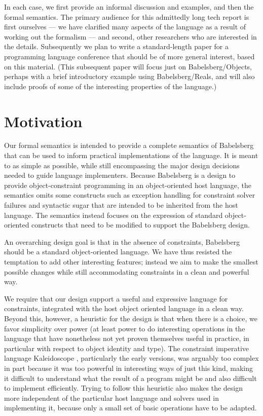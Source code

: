 \documentclass{article}
\begin{document}
In each case, we first provide an informal discussion and examples,
and then the formal semantics.  The primary audience for this
admittedly long tech report is first ourselves --- we have clarified
many aspects of the language as a result of working out the formalism
--- and second, other researchers who are interested in the details.
Subsequently we plan to write a standard-length paper for a
programming language conference that should be of more general
interest, based on this material.  (This subsequent paper will focus just
on Babelsberg/Objects, perhaps with a brief introductory example using
Babelsberg/Reals, and will also include proofs of some of the
interesting properties of the language.)

\section{Motivation}

Our formal semantics is intended to provide a complete semantics of
Babelsberg that can be used to inform practical implementations of
the language. It is meant to as simple as possible, while still 
encompassing the
major design decisions needed to guide language implementers. Because
Babelsberg is a design to provide object-constraint programming in an
object-oriented host language, the semantics omits some constructs
such as exception handling for constraint solver failures and
syntactic sugar that are intended to be inherited from the host
language. The semantics instead focuses on the expression of standard
object-oriented constructs that need to be modified to support the
Babelsberg design.

An overarching design goal is that in the absence of constraints,
Babelsberg should be a standard object-oriented language.  We
have thus resisted the temptation to add other interesting features;
instead we aim to make the smallest possible changes while still accommodating
constraints in a clean and powerful way.

We require that our design support a useful and expressive language
for constraints, integrated with the host object oriented language in
a clean way.  Beyond this, however, a heuristic for the design is that
when there is a choice, we favor simplicity over power (at least power
to do interesting operations in the language that have nonetheless not
yet proven themselves useful in practice, in particular with respect
to object identity and type).  The constraint imperative language
Kaleidoscope \cite{freeman-benson-oopsla-1990, freeman-benson-phd,
  freeman-benson-iccl-1992, freeman-benson-ecoop-1992}, particularly
the early versions, was arguably too complex in part because it was
too powerful in interesting ways of just this kind, making it
difficult to understand what the result of a program might be and also
difficult to implement efficiently.  Trying to follow this heuristic
also makes the design more independent of the particular host language
and solvers used in implementing it, because only a small set of basic
operations have to be adapted.
\end{document}
